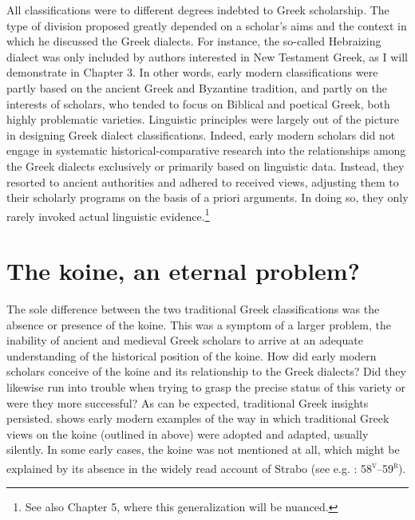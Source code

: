 All classifications were to different degrees indebted to Greek scholarship. The type of division proposed greatly depended on a scholar’s aims and the context in which he discussed the Greek dialects. For instance, the so-called Hebraizing dialect was only included by authors interested in New Testament Greek, as I will demonstrate in Chapter 3. In other words, early modern classifications were partly based on the ancient Greek and Byzantine tradition, and partly on the interests of scholars, who tended to focus on Biblical and poetical Greek, both highly problematic varieties. Linguistic principles were largely out of the picture in designing Greek dialect classifications. Indeed, early modern scholars did not engage in systematic historical-comparative research into the relationships among the Greek dialects exclusively or primarily based on linguistic data. Instead, they resorted to ancient authorities and adhered to received views, adjusting them to their scholarly programs on the basis of a priori arguments. In doing so, they only rarely invoked actual linguistic evidence.\footnote{See also Chapter 5, where this generalization will be nuanced.}

\section{The koine, an eternal problem?}

The sole difference between the two traditional Greek classifications was the absence or presence of the koine. This was a symptom of a larger problem, the inability of ancient and medieval Greek scholars to arrive at an adequate understanding of the historical position of the koine. How did early modern scholars conceive of the koine and its relationship to the Greek dialects? Did they likewise run into trouble when trying to grasp the precise status of this variety or were they more successful? As can be expected, traditional Greek insights persisted.  shows early modern examples of the way in which traditional Greek views on the koine (outlined in  above) were adopted and adapted, usually silently. In some early cases, the koine was not mentioned at all, which might be explained by its absence in the widely read account of Strabo (see e.g. \citealt{Stapleton1566}: 58\textsc{\textsuperscript{v}}–59\textsc{\textsuperscript{r}}).

